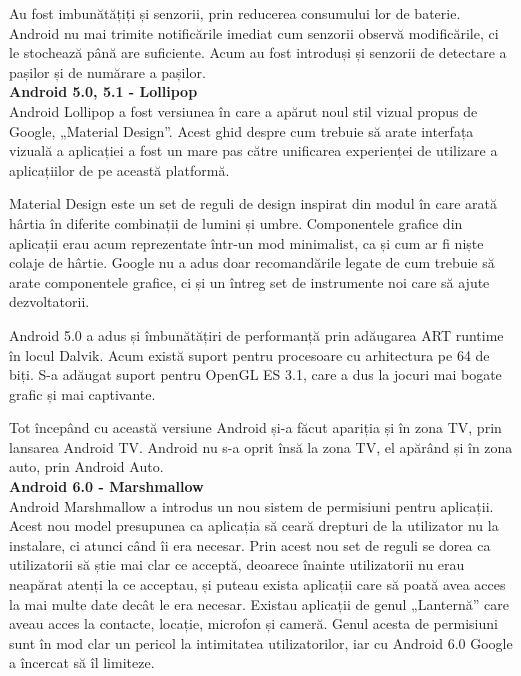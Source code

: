 \documentclass[12pt,a4paper]{article}
\begin{document}
	Au fost imbunătățiți și senzorii, prin reducerea consumului lor de baterie. Android nu  mai trimite notificările imediat cum senzorii observă modificările, ci le stochează până are suficiente.  Acum au fost introduși și senzorii de detectare a pașilor și de numărare a pașilor.\\
	
\textbf{Android 5.0, 5.1 - Lollipop}\\
Android Lollipop a fost versiunea în care a apărut noul stil vizual propus de Google, „Material Design”. Acest ghid despre cum trebuie să arate interfața vizuală a aplicației a fost un mare pas către unificarea experienței de utilizare a aplicațiilor de pe această platformă.
	
	Material Design este un set de reguli de design inspirat din modul în care arată hârtia în diferite combinații de lumini și umbre.
Componentele grafice din aplicații erau acum reprezentate într-un mod minimalist, ca și cum ar fi niște colaje de hârtie. Google nu a adus doar recomandările legate de cum trebuie să arate componentele grafice, ci și un întreg set de instrumente noi care să ajute dezvoltatorii.
	
	Android 5.0 a adus și îmbunătățiri de performanță prin adăugarea ART runtime în locul Dalvik. Acum există suport pentru procesoare cu arhitectura pe 64 de biți. S-a adăugat suport pentru OpenGL ES 3.1, care a dus la jocuri mai bogate grafic și mai captivante.
	
	Tot începând cu această versiune Android și-a făcut apariția și în zona TV, prin lansarea Android TV. Android nu s-a oprit însă la zona TV, el apărând și în zona auto, prin Android Auto.\\

\textbf{Android 6.0 - Marshmallow}\\
Android Marshmallow a introdus un nou sistem de permisiuni pentru aplicații. Acest nou model presupunea ca aplicația să ceară drepturi de la utilizator nu la instalare, ci atunci când îi era necesar. Prin acest nou set de reguli se dorea ca utilizatorii să știe mai clar ce acceptă, deoarece înainte utilizatorii nu erau neapărat atenți la ce acceptau, și puteau exista aplicații care să poată avea acces la mai multe date decât le era necesar. Existau aplicații de genul „Lanternă” care aveau acces la contacte, locație, microfon și cameră. Genul acesta de permisiuni sunt în mod clar un pericol la intimitatea utilizatorilor, iar cu Android 6.0 Google a încercat să îl limiteze.
\end{document}
